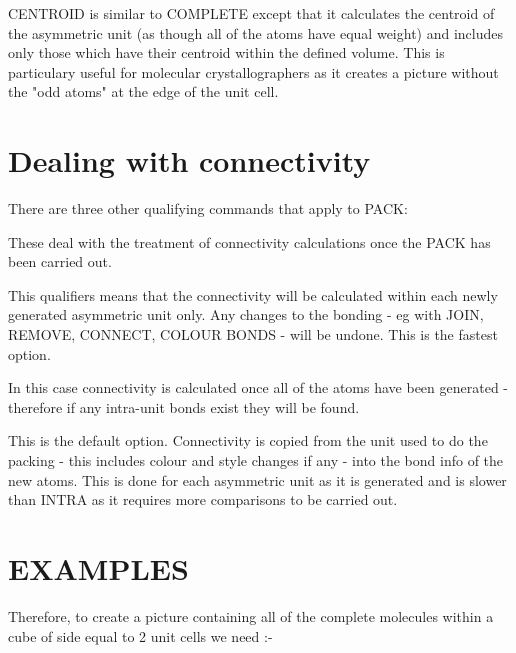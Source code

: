\documentclass[10pt,a4paper]{report}
\begin{document}
\bigskip{}
CENTROID is similar to COMPLETE except that it calculates the
centroid
of the asymmetric unit (as though all of the atoms have equal
weight) and
includes only those which have their centroid within the defined
volume.
This is particulary useful for molecular crystallographers as it
creates
a picture without the "odd atoms" at the edge of the unit cell.
\section{Dealing with connectivity}


There are three other qualifying commands that apply to PACK:


\bigskip{}




\bigskip{}




\bigskip{}


These deal with the treatment of connectivity calculations once
the PACK
has been carried out.


\bigskip{}




This qualifiers means that the connectivity will be calculated
within
each newly generated asymmetric unit only. Any changes to the
bonding -
eg with JOIN, REMOVE, CONNECT, COLOUR BONDS - will be undone.
This is
the fastest option.


\bigskip{}




In this case connectivity is calculated once all of the atoms
have
been generated - therefore if any intra-unit bonds exist they
will be
found.


\bigskip{}




This is the default option. Connectivity is copied from the
unit used
to do the packing - this includes colour and style changes if any
- into
the bond info of the new atoms. This is done for each asymmetric
unit as
it is generated and is slower than INTRA as it requires more
comparisons
to be carried out.
\section{EXAMPLES}


Therefore, to create a picture containing all of the complete
molecules within a cube of side equal to 2 unit cells we need :-
\end{document}
